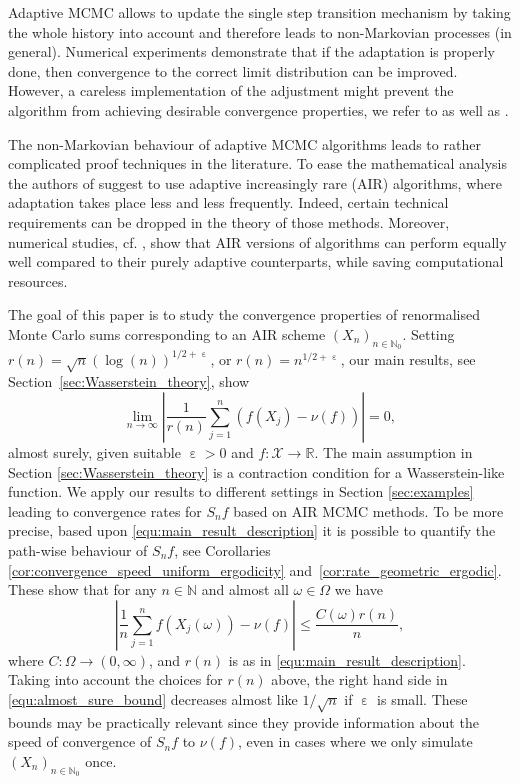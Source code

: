 \documentclass[12pt]{article}
\theoremstyle{definition}
\newcommand{\N}{\mathbb{N}}
\newcommand{\R}{\mathbb{R}}
\newcommand{\cX}{\mathcal{X}}
\DeclareMathOperator{\eps}{\varepsilon}
\begin{document}
Adaptive MCMC allows to update the single step transition mechanism by taking the whole history into account and therefore leads to non-Markovian processes (in general). 
Numerical experiments demonstrate that if the adaptation is 
	properly done, then
	convergence to the correct limit distribution can be improved.
However, a careless implementation of the adjustment might prevent the algorithm from achieving desirable convergence properties, we refer to \cite[Section 2]{atchade2005adaptive} as well as \cite{latuszynski2014adapfail}.    

The non-Markovian behaviour of adaptive MCMC algorithms leads to rather complicated proof techniques in the literature. 
To ease the mathematical analysis the authors of \cite{chimisov2018air} suggest to use adaptive increasingly rare (AIR) algorithms, where adaptation takes place less and less frequently.  
Indeed, certain technical requirements can be dropped in the theory of those methods.
Moreover, numerical studies, cf. \cite[Section 2.2]{chimisov2018air}, show that AIR versions of  algorithms can perform equally well compared to their purely adaptive counterparts, while saving computational resources.

The goal of this paper is to study the convergence properties of renormalised Monte Carlo sums corresponding to an AIR scheme $(X_n)_{n\in\N_0}$.
Setting $r(n) = \sqrt{n}(\log(n))^{1/2+\eps}$, or $r(n) = n^{1/2 + \eps}$,
our main results, see Section~\ref{sec:Wasserstein_theory}, show 
\begin{equation}\label{equ:main_result_description}
	\lim_{n \to \infty} \left\vert \frac{1}{r(n)} \sum_{j=1}^n\left(  f(X_j) - \nu(f)\right)  \right\vert=0, 
\end{equation}
almost surely, given suitable $\eps>0$ and $f \colon \cX \to \R$.
The main assumption in Section \ref{sec:Wasserstein_theory} is a contraction condition for a Wasserstein-like function. 
We apply our results to different settings in Section \ref{sec:examples} leading to convergence rates for $S_nf$ based on AIR MCMC methods.  
To be more precise, based upon \eqref{equ:main_result_description} it is possible to quantify the path-wise behaviour of $S_n f$, see Corollaries \ref{cor:convergence_speed_uniform_ergodicity} and~\ref{cor:rate_geometric_ergodic}. These show that for any $n \in \N$ and almost all $\omega\in \Omega$ we have 
\begin{equation}\label{equ:almost_sure_bound}
	\left\vert  \frac{1}{n}\sum_{j=1}^n f(X_j(\omega)) - \nu(f)   \right\vert \leq \frac{{C(\omega)}r(n)}{n},
\end{equation}
where $C \colon \Omega \to (0, \infty)$, and $r(n)$ is as in \eqref{equ:main_result_description}. 
Taking into account the choices for $r(n)$ above, the right hand side in \eqref{equ:almost_sure_bound} decreases almost like $1/\sqrt{n}$ if $\eps$ is small.  
These bounds may be practically relevant since they provide information about the speed of convergence of $S_n f$ to $\nu(f)$, even in cases where we only simulate $(X_n)_{n \in \N_0}$ once.  
\end{document}
